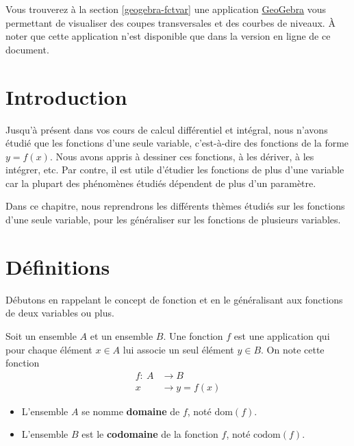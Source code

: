 \documentclass[]{book}
\providecommand{\tightlist}{%
  \setlength{\itemsep}{0pt}\setlength{\parskip}{0pt}}
\theoremstyle{definition}
\theoremstyle{definition}
\theoremstyle{definition}
\theoremstyle{remark}
\let\BeginKnitrBlock\begin \let\EndKnitrBlock\end
\begin{document}
Vous trouverez à la section \ref{geogebra-fctvar} une application
\href{https://www.geogebra.org/?lang=fr}{GeoGebra} vous permettant de
visualiser des coupes transversales et des courbes de niveaux. À noter
que cette application n'est disponible que dans la version en ligne de
ce document.

\hypertarget{introduction-3}{%
\section{Introduction}\label{introduction-3}}

Jusqu'à présent dans vos cours de calcul différentiel et intégral, nous
n'avons étudié que les fonctions d'une seule variable, c'est-à-dire des
fonctions de la forme \(y=f(x)\). Nous avons appris à dessiner ces
fonctions, à les dériver, à les intégrer, etc. Par contre, il est utile
d'étudier les fonctions de plus d'une variable car la plupart des
phénomènes étudiés dépendent de plus d'un paramètre.

Dans ce chapitre, nous reprendrons les différents thèmes étudiés sur les
fonctions d'une seule variable, pour les généraliser sur les fonctions
de plusieurs variables.

\hypertarget{definitions}{%
\section{Définitions}\label{definitions}}

Débutons en rappelant le concept de fonction et en le généralisant aux
fonctions de deux variables ou plus.

\BeginKnitrBlock{definition}[Fonction]
\protect\hypertarget{def:unnamed-chunk-119}{}{\label{def:unnamed-chunk-119}
{} }Soit un ensemble \(A\) et un ensemble \(B\).
Une fonction \(f\) est une application qui pour chaque élément
\(x\in A\) lui associe un seul élément \(y\in B\). On note cette
fonction \begin{align*}
f:\ A&\longrightarrow  B\\
x&\longrightarrow  y=f(x)
\end{align*}

\begin{itemize}
\tightlist
\item
  L'ensemble \(A\) se nomme \textbf{domaine} de \(f\), noté
  \(\text{dom}(f)\).
\item
  L'ensemble \(B\) est le \textbf{codomaine} de la fonction \(f\), noté
  \(\text{codom}(f)\).
\end{itemize}
\EndKnitrBlock{definition}
\end{document}
